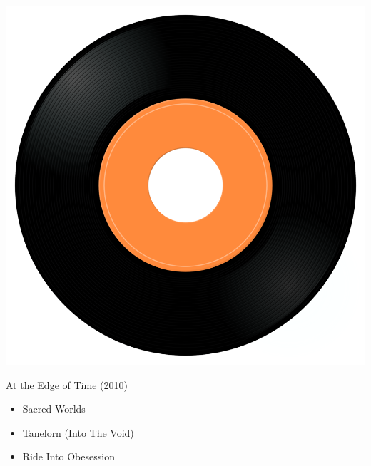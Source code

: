 \begin{minipage}[t]{0.25\textwidth}
\captionsetup{type=figure}
\includegraphics[width=\textwidth]{Images/cover.png}
\caption*{At the Edge of Time (2010)}
\end{minipage}
\begin{minipage}[t]{0.25\textwidth}\vspace{0pt}
\begin{itemize}[nosep,leftmargin=1em,labelwidth=*,align=left]
	\setlength{\itemsep}{0pt}
	\item Sacred Worlds
	\item Tanelorn (Into The Void)
	\item Ride Into Obesession
\end{itemize}
\end{minipage}

